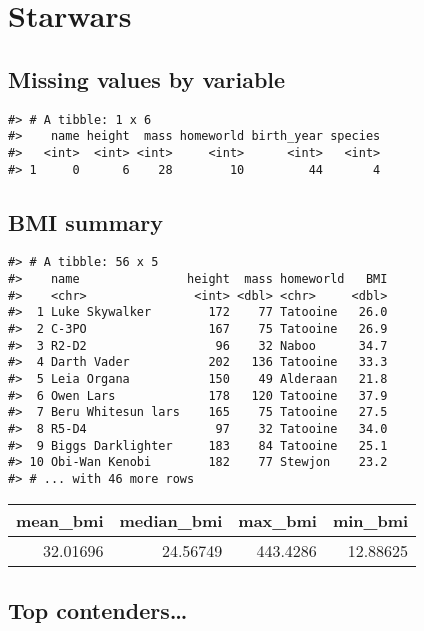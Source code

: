 \documentclass[
]{book}
\begin{document}
\hypertarget{starwars-1}{%
\section{Starwars}\label{starwars-1}}

\hypertarget{missing-values-by-variable}{%
\subsection{Missing values by variable}\label{missing-values-by-variable}}

\begin{verbatim}
#> # A tibble: 1 x 6
#>    name height  mass homeworld birth_year species
#>   <int>  <int> <int>     <int>      <int>   <int>
#> 1     0      6    28        10         44       4
\end{verbatim}

\hypertarget{bmi-summary}{%
\subsection{BMI summary}\label{bmi-summary}}

\begin{verbatim}
#> # A tibble: 56 x 5
#>    name               height  mass homeworld   BMI
#>    <chr>               <int> <dbl> <chr>     <dbl>
#>  1 Luke Skywalker        172    77 Tatooine   26.0
#>  2 C-3PO                 167    75 Tatooine   26.9
#>  3 R2-D2                  96    32 Naboo      34.7
#>  4 Darth Vader           202   136 Tatooine   33.3
#>  5 Leia Organa           150    49 Alderaan   21.8
#>  6 Owen Lars             178   120 Tatooine   37.9
#>  7 Beru Whitesun lars    165    75 Tatooine   27.5
#>  8 R5-D4                  97    32 Tatooine   34.0
#>  9 Biggs Darklighter     183    84 Tatooine   25.1
#> 10 Obi-Wan Kenobi        182    77 Stewjon    23.2
#> # ... with 46 more rows
\end{verbatim}

\begin{tabular}{r|r|r|r}
\hline
mean\_bmi & median\_bmi & max\_bmi & min\_bmi\\
\hline
32.01696 & 24.56749 & 443.4286 & 12.88625\\
\hline
\end{tabular}

\hypertarget{top-contenders}{%
\subsection{Top contenders\ldots{}}\label{top-contenders}}
\end{document}
